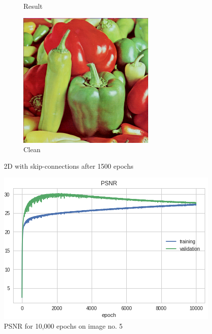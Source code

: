 \documentclass[12pt]{article}
\begin{document}
\begin{figure}[h]
\begin{subfigure}[b]{0.3\linewidth}
    \caption{Result}
  \end{subfigure}
   \begin{subfigure}[b]{0.3\linewidth}
    \includegraphics[width=\linewidth]{2ds_clean.png}
    \caption{Clean}
  \end{subfigure}
  \caption{2D with skip-connections after 1500 epochs}
  \label{2ds results}
\end{figure}

\begin{figure}[h]
	\centering
	\includegraphics[width=0.8\linewidth]{2ds_overfit.png}
	\caption{PSNR for 10,000 epochs on image no. 5}
	\label{2ds overfit}
\end{figure}
\end{document}
